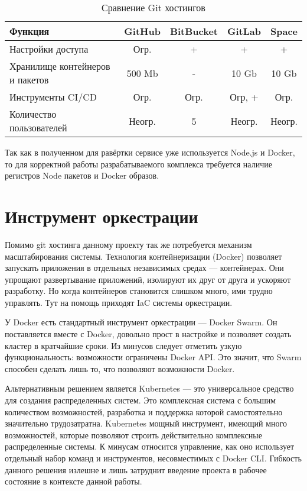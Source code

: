 \begin{center}
    \begin{longtable}{|p{}|c|c|c|c|}
        \caption{Сравнение Git хостингов}
        \label{tab:git-hostings}
        \hline
        Функция                             & GitHub          & BitBucket   & GitLab    & Space \\
        \hline
        Настройки доступа                   & Огр.            & +           & +         & +     \\
        Хранилище контейнеров и пакетов     & 500 Mb          & -           & 10 Gb     & 10 Gb \\
        Инструменты CI/CD                   & Огр.            & Огр.        & Огр, +    & Огр.  \\
        Количество пользователей            & Неогр.          & 5           & Неогр.    & Неогр.\\
        \hline
    \end{longtable}
\end{center}

Так как в полученном для равёртки сервисе уже используется Node.js и Docker, то для корректной работы разрабатываемого комплекса требуется наличие регистров Node пакетов и Docker образов.

\section{Инструмент оркестрации}

Помимо git хостинга данному проекту так же потребуется механизм масштабирования системы.
Технология контейнеризации (Docker) позволяет запускать приложения в отдельных независимых средах --- контейнерах.
Они упрощают развертывание приложений, изолируют их друг от друга и ускоряют разработку.
Но когда контейнеров становится слишком много, ими трудно управлять.
Тут на помощь приходят IaC системы оркестрации.

У Docker есть стандартный инструмент оркестрации --- Docker Swarm.
Он поставляется вместе с Docker, довольно прост в настройке и позволяет создать кластер в кратчайшие сроки.
Из минусов следует отметить узкую функциональность: возможности ограничены Docker API.
Это значит, что Swarm способен сделать лишь то, что позволяют возможности Docker.

Альтернативным решением является Kubernetes --- это универсальное средство для создания распределенных систем.
Это комплексная система с большим количеством возможностей, разработка и поддержка которой самостоятельно значительно трудозатратна.
Kubernetes мощный инструмент, имеющий много возможностей, которые позволяют строить действительно комплексные распределенные системы.
К минусам относится управление, как оно использует отдельный набор команд и инструментов, несовместимых с Docker CLI.
Гибкость данного решения излешне и лишь затруднит введение проекта в рабочее состояние в контексте данной работы.

